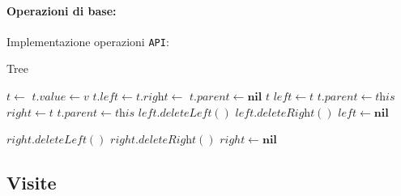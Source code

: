         \paragraph{Operazioni di base:} Implementazione operazioni \texttt{API}:
        \begin{algorithm}[H]
            \caption{Tree}
            \begin{algorithmic}
                    \State \Tree $t \gets$ \New \Tree
                    \State $t.\textit{value} \gets v$
                    \State $t.\textit{left} \gets t.\textit{right} \gets$ 
                    \State $t.\textit{parent} \gets \textbf{nil}$
                    \State \Return $t$
                \EndFunction
                        \State $left \gets t$
                        \State $t.\textit{parent} \gets \textit{this}$
                    \EndIf
                \EndFunction
                        \State $right \gets t$
                        \State $t.\textit{parent} \gets \textit{this}$
                    \EndIf
                \EndFunction
                        \State $left.\textit{deleteLeft}()$
                        \State $left.\textit{deleteRight}()$
                        \State $left \gets \textbf{nil}$
                    \EndIf
                \EndFunction
            \end{algorithmic}
        \end{algorithm}
        \begin{algorithm}[H]
            \begin{algorithmic}
                        \State $right.\textit{deleteLeft}()$
                        \State $right.\textit{deleteRight}()$
                        \State $right \gets \textbf{nil}$
                    \EndIf
                \EndFunction
            \end{algorithmic}
        \end{algorithm}
    \subsection{Visite}
